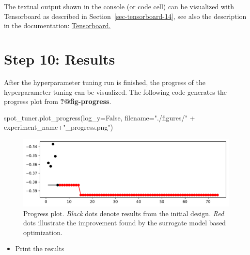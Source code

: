 \documentclass[
  letterpaper,
  DIV=11,
  numbers=noendperiod]{scrreprt}
\newenvironment{Shaded}{\begin{snugshade}}{\end{snugshade}}
\newcommand{\NormalTok}[1]{\textcolor[rgb]{0.00,0.23,0.31}{#1}}
\newcommand{\OperatorTok}[1]{\textcolor[rgb]{0.37,0.37,0.37}{#1}}
\newcommand{\StringTok}[1]{\textcolor[rgb]{0.13,0.47,0.30}{#1}}
\newcommand{\VariableTok}[1]{\textcolor[rgb]{0.07,0.07,0.07}{#1}}
\providecommand{\tightlist}{%
  \setlength{\itemsep}{0pt}\setlength{\parskip}{0pt}}\usepackage{longtable,booktabs,array}
\begin{document}
The textual output shown in the console (or code cell) can be visualized
with Tensorboard as described in Section~\ref{sec-tensorboard-14}, see
also the description in the documentation:
\href{https://sequential-parameter-optimization.github.io/spotPython/14_spot_ray_hpt_torch_cifar10.html\#sec-tensorboard-14}{Tensorboard.}

\hypertarget{sec-results-tuning-18}{%
\section{Step 10: Results}\label{sec-results-tuning-18}}

After the hyperparameter tuning run is finished, the progress of the
hyperparameter tuning can be visualized. The following code generates
the progress plot from \textbf{?@fig-progress}.

\begin{Shaded}
\begin{Highlighting}[]
\NormalTok{spot\_tuner.plot\_progress(log\_y}\OperatorTok{=}\VariableTok{False}\NormalTok{,}
\NormalTok{    filename}\OperatorTok{=}\StringTok{"./figures/"} \OperatorTok{+}\NormalTok{ experiment\_name}\OperatorTok{+}\StringTok{"\_progress.png"}\NormalTok{)}
\end{Highlighting}
\end{Shaded}

\begin{figure}[H]

{\centering \includegraphics{18_spot_hpt_sklearn_multiclass_classification_svc_files/figure-pdf/cell-25-output-1.pdf}

}

\caption{Progress plot. \emph{Black} dots denote results from the
initial design. \emph{Red} dots illustrate the improvement found by the
surrogate model based optimization.}

\end{figure}

\begin{itemize}
\tightlist
\item
  Print the results
\end{itemize}
\end{document}
